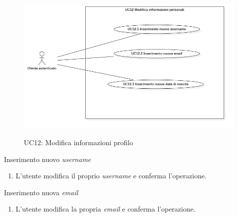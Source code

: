 \begin{figure}[!ht] 
  \centering 
  \includegraphics[width=0.9\columnwidth, alt={Caso d'uso relativo alla modifica delle informazioni del profilo}]{immagini/usecase/UC12.jpg}
  \caption{UC12: Modifica informazioni profilo}\label{fig:uc:modifica-informazioni-profilo}
\end{figure}

\newpage

\begin{usecase}{12.1}{Inserimento nuovo \textit{username}}\label{uc:modifica-username}
  \usecasemain{}
  
  \begin{enumerate}
    \item L'utente modifica il proprio \textit{username} e conferma l'operazione.
  \end{enumerate}
  
\end{usecase}

\begin{usecase}{12.2}{Inserimento nuova \textit{email}}\label{uc:modifica-email}
  \usecasemain{}
  
  \begin{enumerate}
    \item L'utente modifica la propria \textit{email} e conferma l'operazione.
  \end{enumerate}
  
\end{usecase}

